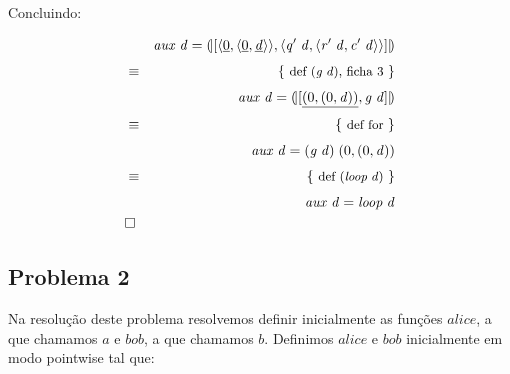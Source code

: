 \documentclass[a4paper]{article}
\newcommand{\Varid}[1]{\mathit{#1}}
\begin{document}
Concluindo:

\begin{eqnarray*}
\start
     \ensuremath{\Varid{aux}\;\Varid{d}\mathrel{=}\cataNat{\alt{\conj{\underline{\mathrm{0}}}{\conj{\underline{\mathrm{0}}}{\underline{\Varid{d}}}}}{\conj{\Varid{q'}\;\Varid{d}}{\conj{\Varid{r'}\;\Varid{d}}{\Varid{c'}\;\Varid{d}}}}}}
%
\just\equiv{def (\ensuremath{\Varid{g}\;\Varid{d}}), ficha 3}
%
     \ensuremath{\Varid{aux}\;\Varid{d}\mathrel{=}\cataNat{\alt{\underline{(\mathrm{0},(\mathrm{0},\Varid{d}))}}{\Varid{g}\;\Varid{d}}}}
%
\just\equiv{def for}
%
     \ensuremath{\Varid{aux}\;\Varid{d}\mathrel{=}(\Varid{g}\;\Varid{d})\;(\mathrm{0},(\mathrm{0},\Varid{d}))}
%
\just\equiv{def (\ensuremath{\Varid{loop}\;\Varid{d}})}
%
     \ensuremath{\Varid{aux}\;\Varid{d}\mathrel{=}\Varid{loop}\;\Varid{d}}
\qed
\end{eqnarray*}

\subsection*{Problema 2}

Na resolução deste problema resolvemos definir inicialmente as funções \ensuremath{\Varid{alice}}, a que chamamos \ensuremath{\Varid{a}} e \ensuremath{\Varid{bob}}, a que chamamos \ensuremath{\Varid{b}}.
Definimos \ensuremath{\Varid{alice}} e \ensuremath{\Varid{bob}} inicialmente em modo pointwise tal que:
\end{document}
